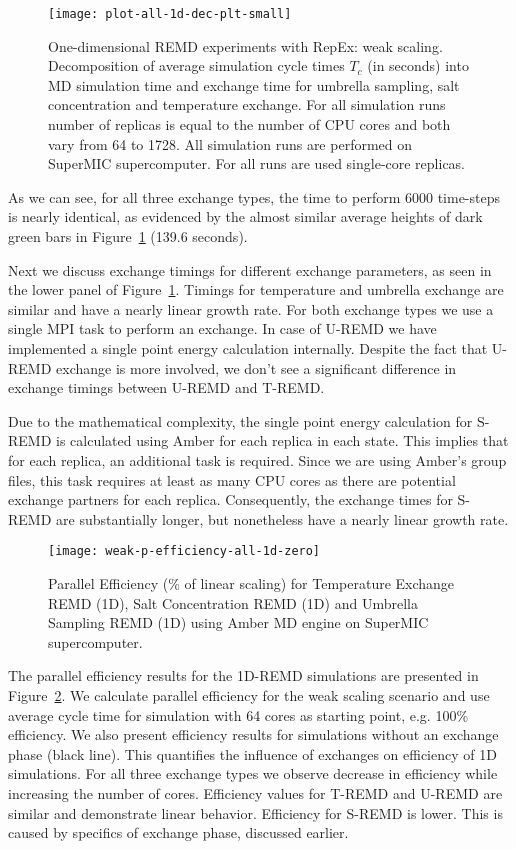 \documentclass{sig-alternate-05-2015}
\begin{document}
\begin{figure}[ht!]
  \centering
  \texttt{[image: plot-all-1d-dec-plt-small]}
  \caption{\small{One-dimensional REMD experiments with RepEx: weak scaling. Decomposition of average simulation cycle times $T_{c}$ (in seconds) into MD simulation time and exchange time for umbrella sampling, salt concentration and temperature exchange. For all simulation runs number of replicas is equal to the number of CPU cores and both vary from 64 to 1728. All simulation runs are performed on SuperMIC supercomputer. For all  runs are used single-core replicas.}  
  }
  \label{fig:1d_results}
\end{figure}

As we can see, for all three exchange types, the time to perform 6000 time-steps is nearly identical, as evidenced by the almost similar average heights of dark green bars in Figure~\ref{fig:1d_results} (139.6 seconds).

Next we discuss exchange timings for different exchange parameters, as seen in the lower panel of Figure~\ref{fig:1d_results}. Timings for temperature and umbrella exchange are similar and have a nearly linear growth rate. For both exchange types we use a single MPI task to perform an exchange. In case of U-REMD we have implemented a single point energy calculation internally. Despite the fact that U-REMD exchange is more involved, we don't see a significant difference in exchange timings between U-REMD and T-REMD. 

Due to the mathematical complexity, the single point energy calculation for S-REMD is calculated using Amber for each replica in each state.  This implies that for each replica, an additional task is required. Since we are using Amber's group files, this task requires at least as many CPU cores as there are potential exchange partners for each replica. Consequently, the exchange times for S-REMD are substantially longer, but nonetheless have a nearly linear growth rate.

\begin{figure}[ht!]
  \centering
  \texttt{[image: weak-p-efficiency-all-1d-zero]}
  \caption{\small{Parallel Efficiency (\% of linear scaling) for Temperature Exchange REMD (1D), Salt Concentration REMD (1D) and Umbrella Sampling REMD (1D) using Amber MD engine on SuperMIC supercomputer.}
  }
  \label{fig:p_efficiency_1d}
\end{figure}

The parallel efficiency results for the 1D-REMD simulations are presented 
in Figure~\ref{fig:p_efficiency_1d}. We calculate parallel efficiency for the weak 
scaling scenario and use average cycle time for simulation with 64 cores as 
starting point, e.g. 100\% efficiency. We also present efficiency results for 
simulations without an exchange phase (black line). This quantifies the influence 
of exchanges on efficiency of 1D simulations. For all three exchange types we observe 
decrease in efficiency while increasing the number of cores. Efficiency values 
for T-REMD and U-REMD are similar and demonstrate linear behavior. Efficiency for S-REMD 
is lower. This is caused by specifics of exchange phase, discussed earlier.
\end{document}

